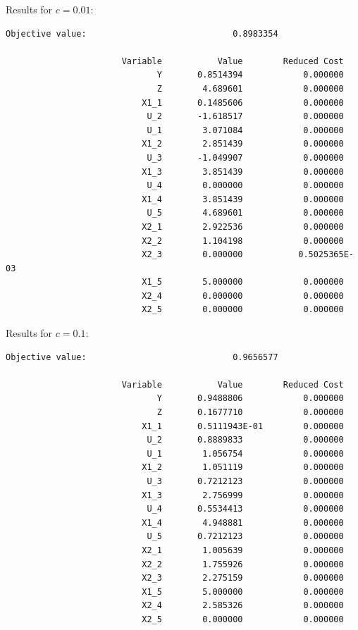 \documentclass{article}
\begin{document}
Results for $c = 0.01$:

\begin{verbatim}
Objective value:                             0.8983354

                       Variable           Value        Reduced Cost
                              Y       0.8514394            0.000000
                              Z        4.689601            0.000000
                           X1_1       0.1485606            0.000000
                            U_2       -1.618517            0.000000
                            U_1        3.071084            0.000000
                           X1_2        2.851439            0.000000
                            U_3       -1.049907            0.000000
                           X1_3        3.851439            0.000000
                            U_4        0.000000            0.000000
                           X1_4        3.851439            0.000000
                            U_5        4.689601            0.000000
                           X2_1        2.922536            0.000000
                           X2_2        1.104198            0.000000
                           X2_3        0.000000           0.5025365E-03
                           X1_5        5.000000            0.000000
                           X2_4        0.000000            0.000000
                           X2_5        0.000000            0.000000
\end{verbatim}

Results for $c = 0.1$:

\begin{verbatim}
Objective value:                             0.9656577

                       Variable           Value        Reduced Cost
                              Y       0.9488806            0.000000
                              Z       0.1677710            0.000000
                           X1_1       0.5111943E-01        0.000000
                            U_2       0.8889833            0.000000
                            U_1        1.056754            0.000000
                           X1_2        1.051119            0.000000
                            U_3       0.7212123            0.000000
                           X1_3        2.756999            0.000000
                            U_4       0.5534413            0.000000
                           X1_4        4.948881            0.000000
                            U_5       0.7212123            0.000000
                           X2_1        1.005639            0.000000
                           X2_2        1.755926            0.000000
                           X2_3        2.275159            0.000000
                           X1_5        5.000000            0.000000
                           X2_4        2.585326            0.000000
                           X2_5        0.000000            0.000000
\end{verbatim}
\end{document}
